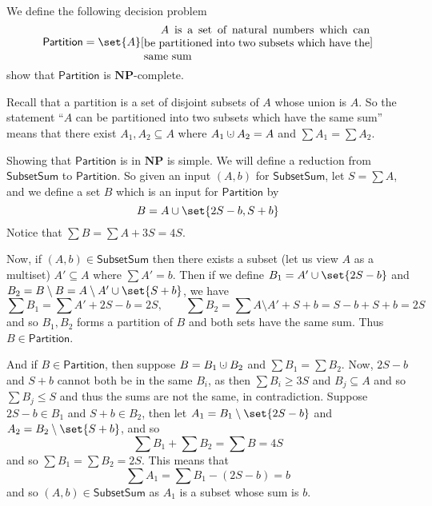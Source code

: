 \documentclass[10pt]{article}
\def\subsum{\mathsf{SubsetSum}}
\def\NP{\mathbf{NP}}
\begin{document}


\bigskip

\def\partition{\mathsf{Partition}}
\begin{exercise*}

    We define the following decision problem
    \[ \partition = \set{A}[\vcenter{\advance\hsize by-5cm\relax
    $A$ is a set of natural numbers which can be partitioned into two subsets which have the same sum}] \]
    show that $\partition$ is $\NP$-complete.

\end{exercise*}

\begin{note}

    Recall that a partition is a set of disjoint subsets of $A$ whose union is $A$.
    So the statement ``$A$ can be partitioned into two subsets which have the same sum'' means that there exist $A_1,A_2\subseteq A$ where $A_1\dcup A_2=A$ and $\sum A_1=\sum A_2$.

\end{note}

Showing that $\partition$ is in $\NP$ is simple.
We will define a reduction from $\subsum$ to $\partition$.
So given an input $(A,b)$ for $\subsum$, let $S=\sum A$, and we define a set $B$ which is an input for $\partition$ by
\[ B = A\cup\set{2S-b,S+b} \]
Notice that $\sum B=\sum A+3S=4S$.

Now, if $(A,b)\in\subsum$ then there exists a subset (let us view $A$ as a multiset) $A'\subseteq A$ where $\sum A'=b$.
Then if we define $B_1=A'\cup\set{2S-b}$ and $B_2=B\setminus B=A\setminus A'\cup\set{S+b}$, we have
\[ \sum B_1 = \sum A' + 2S -b = 2S,\qquad \sum B_2 = \sum A\setminus A' + S+b = S-b + S+b = 2S \]
and so $B_1,B_2$ forms a partition of $B$ and both sets have the same sum.
Thus $B\in\partition$.

And if $B\in\partition$, then suppose $B=B_1\dcup B_2$ and $\sum B_1=\sum B_2$.
Now, $2S-b$ and $S+b$ cannot both be in the same $B_i$, as then $\sum B_i\geq3S$ and $B_j\subseteq A$ and so $\sum B_j\leq S$ and thus the sums are not the same, in contradiction.
Suppose $2S-b\in B_1$ and $S+b\in B_2$, then let $A_1=B_1\setminus\set{2S-b}$ and $A_2=B_2\setminus\set{S+b}$, and so
\[ \sum B_1+\sum B_2 = \sum B = 4S \]
and so $\sum B_1=\sum B_2=2S$.
This means that
\[ \sum A_1 = \sum B_1 - (2S-b) = b \]
and so $(A,b)\in\subsum$ as $A_1$ is a subset whose sum is $b$.
\end{document}
